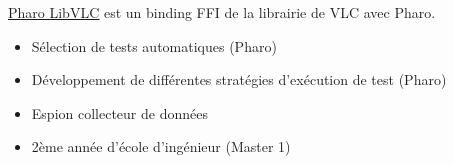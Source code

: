 \documentclass[10pt,a4paper,ragged2e,withhyper]{altacv}
\begin{document}
\divider


\href{https://github.com/badetitou/Pharo-LibVLC}
{\color{blue}\underline{Pharo LibVLC}} est un binding FFI de la librairie de VLC avec Pharo.


\divider

\begin{itemize}
\item Sélection de tests automatiques (Pharo)
\item Développement de différentes stratégies d’exécution de test (Pharo)
\end{itemize}

\divider

\begin{itemize}
  \item Espion collecteur de données
\end{itemize}
  











\begin{itemize}
\item 2ème année d'école d'ingénieur (Master 1)
\end{itemize}
\end{document}
